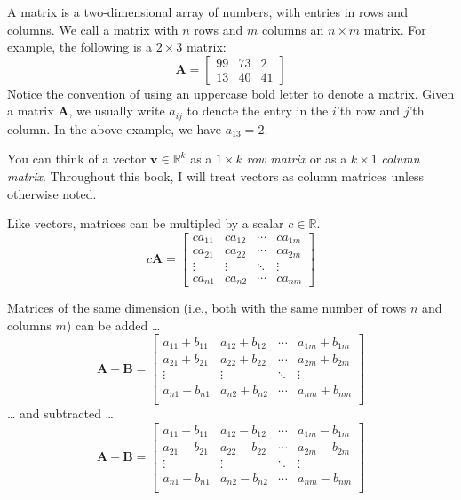 \documentclass[12pt,oneside,openany]{book}
\begin{document}
A matrix is a two-dimensional array of numbers, with entries in rows and
columns. We call a matrix with \(n\) rows and \(m\) columns an
\(n \times m\) matrix. For example, the following is a \(2 \times 3\)
matrix: \[
\mathbf{A}
=
\begin{bmatrix}
  99 & 73 & 2 \\
  13 & 40 & 41
\end{bmatrix}
\] Notice the convention of using an uppercase bold letter to denote a
matrix. Given a matrix \(\mathbf{A}\), we usually write \(a_{ij}\) to
denote the entry in the \(i\)'th row and \(j\)'th column. In the above
example, we have \(a_{13} = 2\).

You can think of a vector \(\mathbf{v} \in \mathbb{R}^k\) as a
\(1 \times k\) \emph{row matrix} or as a \(k \times 1\) \emph{column
matrix}. Throughout this book, I will treat vectors as column matrices
unless otherwise noted.

Like vectors, matrices can be multipled by a scalar
\(c \in \mathbb{R}\). \[
c \mathbf{A} =
\begin{bmatrix}
  c a_{11} & c a_{12} & \cdots & c a_{1m} \\
  c a_{21} & c a_{22} & \cdots & c a_{2m} \\
  \vdots & \vdots & \ddots & \vdots \\
  c a_{n1} & c a_{n2} & \cdots & c a_{nm}
\end{bmatrix}
\]

Matrices of the same dimension (i.e., both with the same number of rows
\(n\) and columns \(m\)) can be added \ldots{} \[
\mathbf{A} + \mathbf{B} =
\begin{bmatrix}
  a_{11} + b_{11} & a_{12} + b_{12} & \cdots & a_{1m} + b_{1m} \\
  a_{21} + b_{21} & a_{22} + b_{22} & \cdots & a_{2m} + b_{2m} \\
  \vdots & \vdots & \ddots & \vdots \\
  a_{n1} + b_{n1} & a_{n2} + b_{n2} & \cdots & a_{nm} + b_{nm} \\
\end{bmatrix}
\] \ldots{} and subtracted \ldots{} \[
\mathbf{A} - \mathbf{B} =
\begin{bmatrix}
  a_{11} - b_{11} & a_{12} - b_{12} & \cdots & a_{1m} - b_{1m} \\
  a_{21} - b_{21} & a_{22} - b_{22} & \cdots & a_{2m} - b_{2m} \\
  \vdots & \vdots & \ddots & \vdots \\
  a_{n1} - b_{n1} & a_{n2} - b_{n2} & \cdots & a_{nm} - b_{nm} \\
\end{bmatrix}
\]
\end{document}
